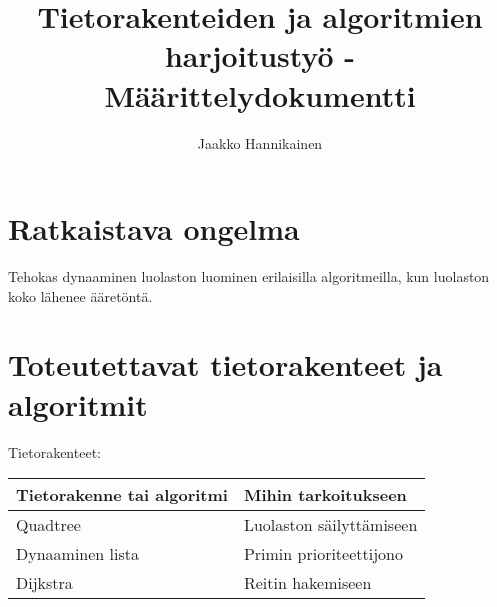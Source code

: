\documentclass{article}
\author{Jaakko Hannikainen}
\title{Tietorakenteiden ja algoritmien harjoitustyö - Määrittelydokumentti}
\begin{document}
\maketitle

\section{Ratkaistava ongelma}
Tehokas dynaaminen luolaston luominen erilaisilla algoritmeilla, kun luolaston
koko lähenee ääretöntä.

\section{Toteutettavat tietorakenteet ja algoritmit}
Tietorakenteet:

\begin{table}[h]
\begin{tabular}{| l | l |}
\hline
\rowcolor{Gray}
Tietorakenne tai algoritmi & Mihin tarkoitukseen      \\ \hline
Quadtree                   & Luolaston säilyttämiseen \\ \hline
Dynaaminen lista           & Primin prioriteettijono  \\ \hline
Dijkstra                   & Reitin hakemiseen        \\ \hline
\end{tabular}
\end{table}
\end{document}
